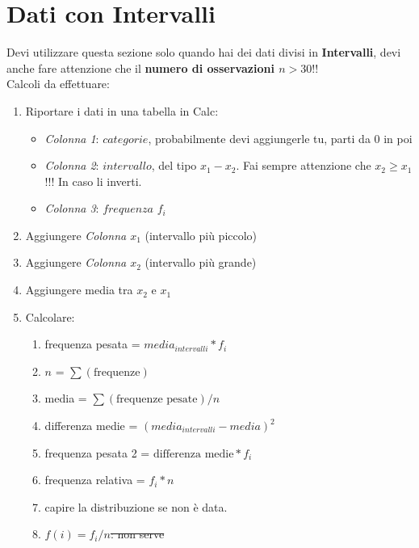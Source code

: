 \section{Dati con Intervalli}

Devi utilizzare questa sezione solo quando hai dei dati divisi in
\textbf{Intervalli}, devi anche fare attenzione che il \textbf{numero di
    osservazioni $n > 30$}!!\\

Calcoli da effettuare:

\begin{enumerate}
    \item Riportare i dati in una tabella in Calc:
          \begin{itemize}
              \item \textit{Colonna 1}: $categorie$, probabilmente devi
                    aggiungerle tu, parti da 0 in poi
              \item \textit{Colonna 2}: $intervallo$, del tipo $x_1 - x_2$.
                    Fai sempre attenzione che $x_2 \ge x_1$ !!! In caso li
                    inverti.
              \item  \textit{Colonna 3}: $frequenza$ $f_i$
          \end{itemize}
    \item Aggiungere \textit{Colonna $x_1$} (intervallo più piccolo)
    \item Aggiungere \textit{Colonna $x_2$} (intervallo più grande)
    \item Aggiungere media tra \textit{$x_2$} e \textit{$x_1$}
    \item Calcolare:
          \begin{enumerate} %
              \item frequenza pesata = $media_{intervalli} * f_i$
              \item $n$ = $\sum(\text{frequenze})$
              \item media = $\sum(\text{frequenze pesate})/n$
              \item differenza medie = $(media_{intervalli} - media)^2$
              \item frequenza pesata 2 = $\text{differenza medie} * f_i$
              \item frequenza relativa = $f_i * n$
              \item capire la distribuzione se non è data. %
              \item \st{$f(i) = f_i / n$: non serve} %

\end{enumerate}
\end{enumerate}
